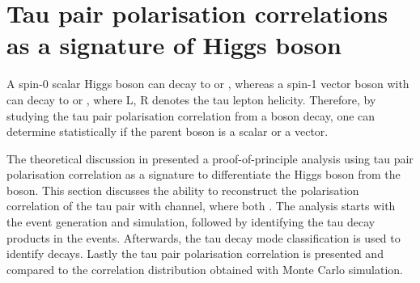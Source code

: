 \section{Tau pair polarisation correlations as a signature of Higgs boson}
\label{sec:tauHZ}



A  spin-0 scalar Higgs boson can decay to  or , whereas  a   spin-1 vector boson \PZ with can decay to  or , where L, R denotes the tau lepton helicity. Therefore, by studying the tau pair polarisation correlation from a boson decay, one can determine statistically if the parent boson is a  scalar or a vector.

The theoretical discussion in  presented a proof-of-principle analysis using tau pair polarisation correlation as a signature to differentiate the Higgs boson from the \PZ boson. This section discusses the ability to reconstruct the polarisation correlation of the tau pair with \ZToTauTau channel, where both \tauToPion. The analysis starts with the event generation and simulation, followed by identifying the tau decay products in the events. Afterwards, the tau decay mode classification is used to identify \tauToPion decays. Lastly the tau pair polarisation correlation is presented and compared to the correlation distribution obtained with Monte Carlo simulation.








